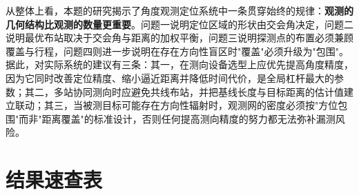 \documentclass[12pt,a4paper]{ctexart}
\begin{document}
从整体上看，本题的研究揭示了角度观测定位系统中一条贯穿始终的规律：\textbf{观测的几何结构比观测的数量更重要}。问题一说明定位区域的形状由交会角决定，问题二说明最优布站取决于交会角与距离的加权平衡，问题三说明探测点的布置必须兼顾覆盖与行程，问题四则进一步说明在存在方向性盲区时"覆盖"必须升级为"包围"。据此，对实际系统的建议有三条：其一，在测向设备选型上应优先提高角度精度，因为它同时改善定位精度、缩小逼近距离并降低时间代价，是全局杠杆最大的参数；其二，多站协同测向时应避免共线布站，并把基线长度与目标距离的估计值建立联动；其三，当被测目标可能存在方向性辐射时，观测网的密度必须按"方位包围"而非"距离覆盖"的标准设计，否则任何提高测向精度的努力都无法弥补漏测风险。

\section{结果速查表}
\end{document}
